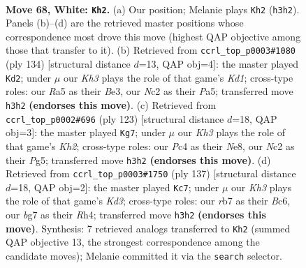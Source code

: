 \documentclass[11pt]{article}
\begin{document}
\clearpage

\begin{figure}[p]\centering
\begin{subfigure}{0.46\textwidth}\centering
\resizebox{\linewidth}{!}{%
\newchessgame
\chessboard[
  setfen={7k/1r4b1/4R3/R7/2P5/7K/2N5/8 w - - 56 68},
  showmover=false,
  pgfstyle=straightmove, color=movearrow, markmove={h3-h2}
]}
\caption{}
\end{subfigure}\hfill
\begin{subfigure}{0.46\textwidth}\centering
\resizebox{\linewidth}{!}{%
\newchessgame
\chessboard[
  setfen={k1r5/1b6/6R1/P7/8/4B3/8/3K4 w - - 19 68},
  showmover=false,
  pgfstyle=straightmove, color=movearrow, markmove={d1-d2}
]}
\caption{}
\end{subfigure}
\\[4pt]
\begin{subfigure}{0.46\textwidth}\centering
\resizebox{\linewidth}{!}{%
\newchessgame
\chessboard[
  setfen={4n3/7k/8/6p1/4K3/5B2/7P/8 b - - 3 62},
  showmover=false,
  pgfstyle=straightmove, color=movearrow, markmove={h7-g7}
]}
\caption{}
\end{subfigure}\hfill
\begin{subfigure}{0.46\textwidth}\centering
\resizebox{\linewidth}{!}{%
\newchessgame
\chessboard[
  setfen={1R6/8/P1bk4/8/7r/KB6/8/8 b - - 2 69},
  showmover=false,
  pgfstyle=straightmove, color=movearrow, markmove={d6-c7}
]}
\caption{}
\end{subfigure}
\caption{\textbf{Move 68, White: \texttt{Kh2}.} (a) Our position; Melanie plays \texttt{Kh2} (\texttt{h3h2}). Panels (b)--(d) are the retrieved master positions whose correspondence most drove this move (highest QAP objective among those that transfer to it). (b) Retrieved from \texttt{ccrl\_top\_p0003\#1080} (ply 134) [structural distance $d$=13, QAP obj=4]: the master played \texttt{Kd2}; under $\mu$ our \emph{Kh3} plays the role of that game's \emph{Kd1}; cross-type roles: our \emph{R}a5 as their \emph{B}e3, our \emph{N}c2 as their \emph{P}a5; transferred move \texttt{h3h2} \textbf{(endorses this move)}. (c) Retrieved from \texttt{ccrl\_top\_p0002\#696} (ply 123) [structural distance $d$=18, QAP obj=3]: the master played \texttt{Kg7}; under $\mu$ our \emph{Kh3} plays the role of that game's \emph{Kh2}; cross-type roles: our \emph{P}c4 as their \emph{N}e8, our \emph{N}c2 as their \emph{P}g5; transferred move \texttt{h3h2} \textbf{(endorses this move)}. (d) Retrieved from \texttt{ccrl\_top\_p0003\#1750} (ply 137) [structural distance $d$=18, QAP obj=2]: the master played \texttt{Kc7}; under $\mu$ our \emph{Kh3} plays the role of that game's \emph{Kd3}; cross-type roles: our \emph{r}b7 as their \emph{B}c6, our \emph{b}g7 as their \emph{R}h4; transferred move \texttt{h3h2} \textbf{(endorses this move)}. Synthesis: 7 retrieved analogs transferred to \texttt{Kh2} (summed QAP objective 13, the strongest correspondence among the candidate moves); Melanie committed it via the \texttt{search} selector.}
\label{fig:thought-m134}
\end{figure}
\end{document}
